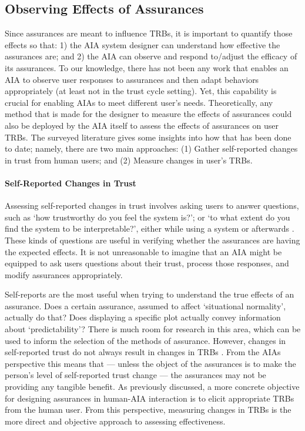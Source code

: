 \subsection{Observing Effects of Assurances} \label{sec:measuring_effects}
    Since assurances are meant to influence TRBs, it is important to quantify those effects so that:  1) the AIA system designer can understand how effective the assurances are; and 2) the AIA can observe and respond to/adjust the efficacy of its assurances. To our knowledge, there has not been any work that enables an AIA to observe user responses to assurances and then adapt behaviors appropriately (at least not in the trust cycle setting). 
    Yet, this capability is crucial for enabling AIAs to meet different user's needs. 
Theoretically, any method that is made for the designer to measure the effects of assurances could also be deployed by the AIA itself to assess the effects of assurances on user TRBs. 
The surveyed literature gives some insights into how that has been done to date; namely, there are two main approaches: (1)  Gather self-reported changes in trust from human users; and (2) Measure changes in user's TRBs. 
    
    \paragraph{Self-Reported Changes in Trust} Assessing self-reported changes in trust involves asking users to answer questions, such as `how trustworthy do you feel the system is?'; or `to what extent do you find the system to be interpretable?', either while using a system or afterwards \cite{Mcknight2011-gv,Muir1996-gt,Wickens1999-la,Salem2015-md,Kaniarasu2013-ho}. These kinds of questions are useful in verifying whether the assurances are having the expected effects. It is not unreasonable to imagine that an AIA might be equipped to ask users questions about their trust, process those responses, and modify assurances appropriately.

    Self-reports are the most useful when trying to understand the true effects of an assurance. Does a certain assurance, assumed to affect `situational normality', actually do that? 
    Does displaying a specific plot actually convey information about `predictability'? 
    There is much room for research in this area, which can be used to inform the selection of the methods of assurance. 
    However, changes in self-reported trust do not always result in changes in TRBs \cite{Dzindolet2003-ts}. From the AIAs perspective this means that --- unless the object of the assurances is to make the person's level of self-reported trust change --- the assurances may not be providing any tangible benefit. 
    As previously discussed, a more concrete objective for designing assurances in human-AIA interaction is to elicit appropriate TRBs from the human user. 
    From this perspective, measuring changes in TRBs is the more direct and objective approach to assessing effectiveness.%

